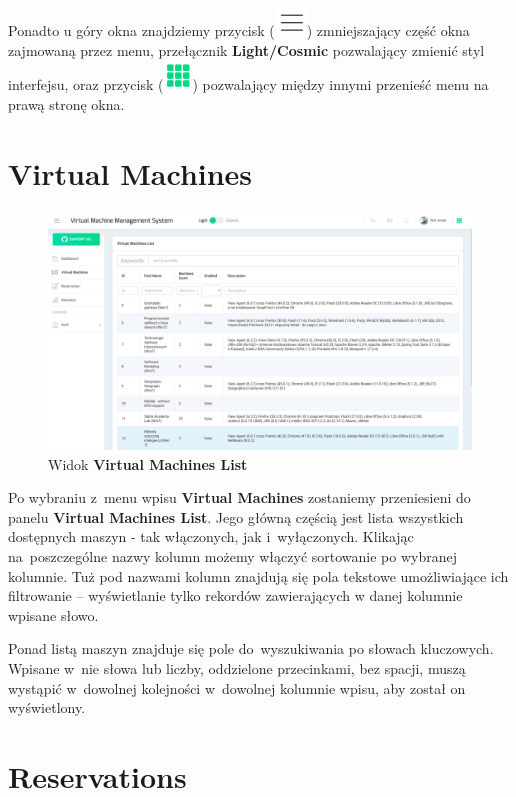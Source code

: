 \documentclass[a5paper, twoside, openany]{book}
\begin{document}
  Ponadto u góry okna znajdziemy przycisk (\includegraphics[height=1 em]{button_menu}) zmniejszający część okna zajmowaną przez menu, przełącznik \textbf{Light/Cosmic} pozwalający zmienić styl interfejsu, oraz przycisk (\includegraphics[height=1 em]{button_layouts}) pozwalający między innymi przenieść menu na prawą stronę okna.

  \section{Virtual Machines}
  \label{VMs}

  \begin{figure}[H]
    \centerline{\includegraphics[width=0.9 \textwidth]{list}}
    \caption{Widok \textbf{Virtual Machines List}}
  \end{figure}

  Po wybraniu z~menu wpisu \textbf{Virtual Machines} zostaniemy przeniesieni do panelu \textbf{Virtual Machines List}. Jego główną częścią jest lista wszystkich dostępnych maszyn - tak włączonych, jak i~wyłączonych. Klikając na~poszczególne nazwy kolumn możemy włączyć sortowanie po wybranej kolumnie. Tuż pod nazwami kolumn znajdują się pola tekstowe umożliwiające ich filtrowanie -- wyświetlanie tylko rekordów zawierających w danej kolumnie wpisane słowo.

  Ponad listą maszyn znajduje się pole do~wyszukiwania po słowach kluczowych. Wpisane w~nie słowa lub liczby, oddzielone przecinkami, bez spacji, muszą wystąpić w~dowolnej kolejności w~dowolnej kolumnie wpisu, aby został on wyświetlony.

  \section{Reservations}
\end{document}
